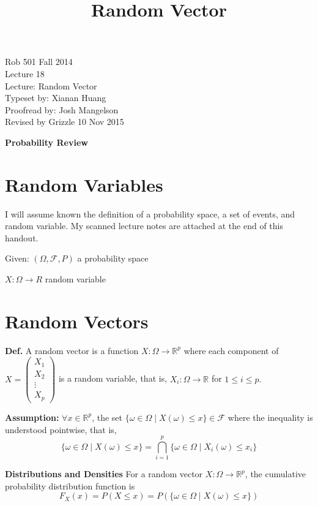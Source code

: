 \documentclass{article}
\title{Random Vector}
\newcommand{\real}{\mathbb R}  %
\begin{document}
    \pagestyle{plain}

    {\Large \bf
    \begin{center}
    Rob 501 Fall 2014\\
    Lecture 18\\
    Lecture: Random Vector\\
    Typeset by:  Xianan Huang\\
    Proofread by: Josh Mangelson\\
    Revised by Grizzle 10 Nov 2015
    \end{center}
    }
    \Large

    \begin{center}\textbf{Probability Review}\end{center}

    \section{Random Variables}
    \setlength{\parskip}{0.5\baselineskip}
    \noindent
    I will assume known the definition of a probability space, a set of events, and random variable. My scanned lecture notes are attached at the end of this handout.


    Given: $(\Omega,\mathscr{F},P)$ a probability space

    \setlength\parindent{3em}
    $X: \Omega \rightarrow R$ random variable

    \section{Random Vectors}
        \noindent
        \textbf{Def.} A random vector is a function $X: \Omega \rightarrow \real^p$ where each component of $X=\left( \begin{array}{ccc}
        X_1\\X_2\\\vdots\\X_p\end{array} \right)$ is a random variable, that is, $X_i: \Omega \rightarrow \real$ for $1 \le i \le p.$

        \noindent
        \textbf{Assumption:} $\forall x \in \real^p $, the set $\{\omega \in \Omega \mid X(\omega) \le x\} \in \mathscr{F}$ where the inequality is understood pointwise, that is, $$\{\omega \in \Omega \mid X(\omega) \le x \} = \bigcap\limits^p_{i=1} \{\omega \in \Omega \mid X_i(\omega) \le x_i\}$$

        \noindent
        \textbf{Distributions and Densities} For a random vector $X: \Omega \rightarrow \real^p$, the cumulative probability distribution function is $$F_X(x)=P(X \le x) = P(\{\omega \in \Omega \mid X(\omega) \le x\})$$
\end{document}
